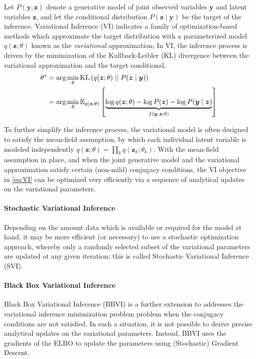 \documentclass[11pt]{article}
\begin{document}
Let $P(\bm y, \bm z)$ denote a generative model of joint observed variables
$\bm y$ and latent variables $\bm z$, and let the conditional distribution
$P(\bm z\mid \bm y)$ be the target of the inference.  Variational Inference
(VI) indicates a family of optimization-based methods which approximate the
target distribution with a parameterized model $q(\bm z; \theta)$ known as the
\emph{variational} approximation;  In VI, the inference process is driven by
the minimization of the Kullback-Leibler (KL) divergence between the
variational approximation and the target conditional,
%
\begin{align}
  \theta^* &= \arg\min_\theta {\operatorname{KL}}\left( q(\bm z; \theta) \mid\mid P(\bm z\mid
  \bm y) \right) \\
  &= \arg\min_\theta {\mathbb{E}}_{q(\bm z; \theta)}\left[ \underbrace{ \log q(\bm z; \theta) - \log
  P(\bm z) -\log P(\bm y\mid \bm z) }_{f(\bm y, \bm z; \theta)} \right] \label{eq:VI}
\end{align}


To further simplify the inference process, the variational model is often
designed to satisfy the mean-field assumption, by which each individual latent
variable is modeled independently $q(\bm z; \theta) = \prod_k q(\bm z_k;
\theta_k)$.  With the mean-field assumption in place, and when the joint
generative model and the variational approximation satisfy certain (non-mild)
conjugacy conditions, the VI objective in \cref{eq:VI} can be optimized very
efficiently via a sequence of analytical updates on the variational parameters.
\paragraph{Stochastic Variational Inference}  Depending on the amount data
which is available or required for the model at hand, it may be more efficient
(or necessary) to use a stochastic optimization approach, whereby only
a randomly selected subset of the variational parameters are updated at any
given iteration; this is called Stochastic Variational Inference (SVI).

\paragraph{Black Box Variational Inference}  Black Box Variational Inference
(BBVI) is a further extension to addresses the variational inference
minimization problem problem when the conjugacy conditions are not satisfied.
In such a situation, it is not possible to derive precise analytical updates on
the variational parameters.  Instead, BBVI uses the gradients of the ELBO to
update the parameters using (Stochastic) Gradient Descent.
\end{document}
